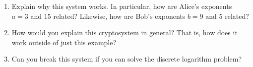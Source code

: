\documentclass[11pt,letterpaper]{article}
\begin{document}
\begin{enumerate}
    \begin{enumerate}
        \item Explain why this system works.
        In particular, how are Alice's exponents $a = 3$ and 15 related?
        Likewise, how are Bob's exponents $b = 9$ and 5 related?

        \item How would you explain this cryptosystem in general? That is, how does it work outside of just this example?

        \item Can you break this system if you can solve the discrete logarithm problem?
    \end{enumerate}

\end{enumerate}
\end{document}
